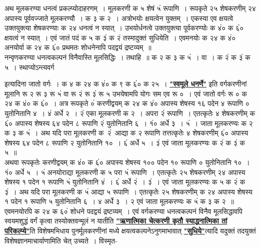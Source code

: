\documentclass[11pt, openany]{book}
\begin{document}
\vspace{-3mm}
 अथ मूलकरण्या धनत्वं प्रकल्प्योदाहरणम्~। मूलकरणी क ५ शेषं 
५ं रूपाणि~। रूपकृते २५ शेषकरणीम् २४ अपास्य पूर्ववज्जाते मूलकरण्यौ~। क ३ 
क २~। अत्रोभयोः क्षयत्वेन युक्तम्~। एकस्या एव क्षयत्वे उक्तयुक्त्या 
शेषकरण्याः क २४ धनत्वं न स्यात्~। उभयोर्धनत्वे उक्तयुक्त्या पूर्वकरण्योः
क ४ं० क ६ं० क्षयत्वं न स्यात्~। एवं जातं पदं क ५ क ३ं 
क २ं तस्मादुक्तं सुधियेति~। एवमनयोः क २४ क ४ं० अनयोर्वा 
क २४ क ६ं० प्रथमतः शोधनेनापि पदद्वयं द्रष्टव्यम्~॥\\

\vspace{-3mm}
 नन्वृणकरण्या धनत्वकल्पनं विनैवास्ति मूलसिद्धिः~। तथाहि~॥
क २ क ३ क ५ं~। वा~। क २ं क ३ं क ५~। स्थाप्योऽन्त्यवर्ग
\newpage%

\noindent इत्यादिना जातो वर्गः~। क ४ क २४ क ४ं० क ९ क ६ं० क २५~। \hyperref[1.4]{\textbf{"स्वमूले धनर्णे"}} इति वर्गकरणीनां मूलानि रू २ रू ३ रू ५ं वा रू २ं रू ३ं रू ५ उभयेषामपि योगः सम एव रू ०~। एवं जातो वर्गः रू ० क २४ क ४ं० क ६ं०~। अत्र रूपकृते ०ं करणीद्वयम् क २४ क ४ं० अपास्य शेषस्य १६ पदेन ४ रूपाणि ० युतोनितानि ४~। ४ं 
अर्धे २~। २ं एका मूलकरणी क २~। अपरा २ं रूपाणि~। एतत्कृतेः ४
शेषकरणीम् क ६ं० अपास्य शेषस्य ६४ पदेन ८ रूपाणि २ं युतोनितानि ६~। 
१ं० अर्धे ३~। ५ं~। जाता मूलकरण्यः क २ क ३ क ५ं~। अथ यदि परा 
मूलकरणी क~२ं~आद्या क २ रूपाणि तत्तत्कृतेः ४ शेषकरणीम् ६ं० अपास्य शेषस्य ६४ पदेन ८ रूपाणि २ युतोनितानि १०~। ६ं अर्धे ५~। ३ं एवं जाता मूलकरण्यः क २ं क ३ं क ५~॥\\

\vspace{-3mm}
 अथवा रूपकृतेः करणीद्वयम् क ४ं० क ६ं० अपास्य शेषस्य १०० 
पदेन १० रूपाणि ० युतोनितानि १०~। १ं० अर्धे ५~। ५ं अनयोराद्या 
मूलकरणी क ५ परा ५ं रूपाणि~। एतत्कृतेः २५ शेषकरणीम् २४ अपास्य 
शेषस्य १ पदेन १ रूपाणि ५ं युतोनितानि ४ं~। ६ं अर्धे २ं~। ३ं~। 
एवं जाता मूलकरण्यः क ५ क २ं क ३ं~। अथ यदि परा मूलकरणी 
क ५ं आद्या ५ रूपाणि~। एतत्कृतेः २५ शेषकरणीम् क २४ अपास्य 
शेषस्य १ पदेन १ रूपाणि ५ युतोनितानि ६~। ४ अर्धे ३~। २ 
एवं जाता मूलकरण्यः क ५ं क ३ क २~॥\\

\vspace{-3mm}
 एवमनयोरपि क २४ क ६०ं शोधने पदद्वयं द्रष्टव्यम्~। एवं वर्गकरण्या 
धनत्वकल्पनं विनैव मूलसिद्धावपि स्वयमशुद्धं वर्गं कृत्वा तस्योक्तवन्मूलं
न यातीति \hyperref[21]{\textbf{"ऋणात्मिका चेत्करणी कृतौ स्याद्धनात्मिका तां परिकल्प्ये"}}ति विशेषमभिधाय पुनर्मूलकरणीनां मध्ये क्षयत्वकल्पनेऽनुगमाभावात् \hyperref[21]{\textbf{"सुधिये"}}त्यादि यदुक्तं तदयुक्तं विशेषज्ञानमाचार्याणामिति चेत् उच्यते~। विस्मृत-
\end{document}
